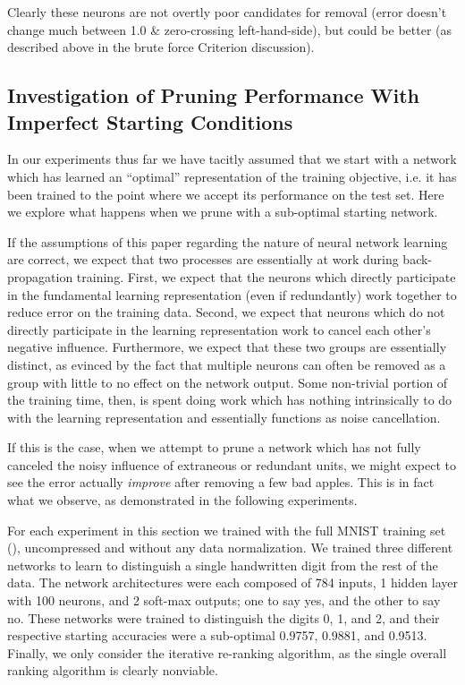 Clearly these neurons are not overtly poor candidates for removal (error doesn't change much between 1.0 \& zero-crossing left-hand-side), but could be better (as described above in the brute force Criterion discussion).

\subsection{Investigation of Pruning Performance With Imperfect Starting Conditions}

In our experiments thus far we have tacitly assumed that we start with a network which has learned an ``optimal'' representation of the training objective, i.e. it has been trained to the point where we accept its performance on the test set. Here we explore what happens when we prune with a sub-optimal starting network. 

If the assumptions of this paper regarding the nature of neural network learning are correct, we expect that two processes are essentially at work during back-propagation training. First, we expect that the neurons which directly participate in the fundamental learning representation (even if redundantly) work together to reduce error on the training data. Second, we expect that neurons which do not directly participate in the learning representation work to cancel each other's negative influence. Furthermore, we expect that these two groups are essentially distinct, as evinced by the fact that multiple neurons can often be removed as a group with little to no effect on the network output. Some non-trivial portion of the training time, then, is spent doing work which has nothing intrinsically to do with the learning representation and essentially functions as noise cancellation. 

If this is the case, when we attempt to prune a network which has not fully canceled the noisy influence of extraneous or redundant units, we might expect to see the error actually \textit{improve} after removing a few bad apples. This is in fact what we observe, as demonstrated in the following experiments. 

For each experiment in this section we trained with the full MNIST training set (\cite{lecun-mnisthandwrittendigit-2010}), uncompressed and without any data normalization. We trained three different networks to learn to distinguish a single handwritten digit from the rest of the data. The network architectures were each composed of 784 inputs, 1 hidden layer with 100 neurons, and 2 soft-max outputs; one to say yes, and the other to say no. These networks were trained to distinguish the digits 0, 1, and 2, and their respective starting accuracies were a sub-optimal 0.9757, 0.9881, and 0.9513. Finally, we only consider the iterative re-ranking algorithm, as the single overall ranking algorithm is clearly nonviable. 

